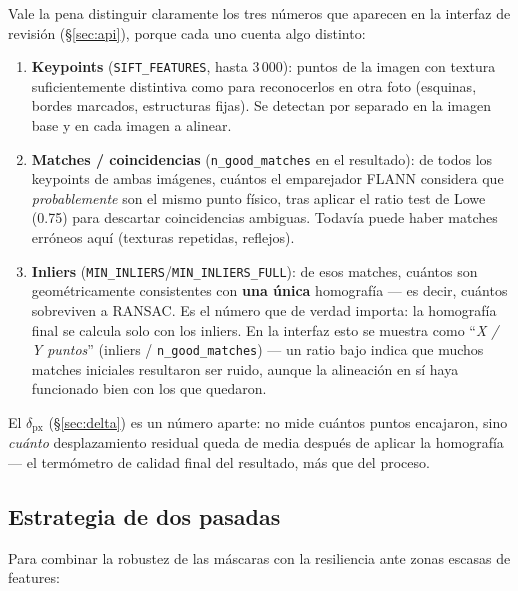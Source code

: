 \begin{infobox}
Vale la pena distinguir claramente los tres números que aparecen en la interfaz de revisión
(\S\ref{sec:api}), porque cada uno cuenta algo distinto:
\begin{enumerate}[leftmargin=1.5em]
  \item \textbf{Keypoints} (\texttt{SIFT\_FEATURES}, hasta 3\,000): puntos de la imagen con
        textura suficientemente distintiva como para reconocerlos en otra foto (esquinas,
        bordes marcados, estructuras fijas). Se detectan por separado en la imagen base y en
        cada imagen a alinear.
  \item \textbf{Matches / coincidencias} (\texttt{n\_good\_matches} en el resultado): de todos
        los keypoints de ambas imágenes, cuántos el emparejador FLANN considera que
        \emph{probablemente} son el mismo punto físico, tras aplicar el ratio test de Lowe
        (0.75) para descartar coincidencias ambiguas. Todavía puede haber matches erróneos
        aquí (texturas repetidas, reflejos).
  \item \textbf{Inliers} (\texttt{MIN\_INLIERS}/\texttt{MIN\_INLIERS\_FULL}): de esos matches,
        cuántos son geométricamente consistentes con \textbf{una única} homografía —
        es decir, cuántos sobreviven a RANSAC. Es el número que de verdad importa: la
        homografía final se calcula solo con los inliers. En la interfaz esto se muestra como
        ``\emph{X / Y puntos}'' (inliers / \texttt{n\_good\_matches}) — un ratio bajo indica que
        muchos matches iniciales resultaron ser ruido, aunque la alineación en sí haya
        funcionado bien con los que quedaron.
\end{enumerate}
El $\delta_{\text{px}}$ (\S\ref{sec:delta}) es un número aparte: no mide cuántos puntos
encajaron, sino \emph{cuánto} desplazamiento residual queda de media después de aplicar la
homografía — el termómetro de calidad final del resultado, más que del proceso.
\end{infobox}

\subsection{Estrategia de dos pasadas}

Para combinar la robustez de las máscaras con la resiliencia ante zonas escasas de features:

